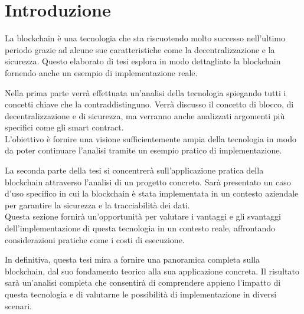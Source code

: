 \chapter{Introduzione}
\label{cha:introduzione}

La blockchain è una tecnologia che sta riscuotendo molto successo nell'ultimo
periodo grazie ad alcune sue caratteristiche come la decentralizzazione e la
sicurezza. Questo elaborato di tesi esplora in modo dettagliato la blockchain
fornendo anche un esempio di implementazione reale.

Nella prima parte verrà effettuata un'analisi della tecnologia spiegando tutti
i concetti chiave che la contraddistinguno. Verrà discusso il concetto di
blocco, di decentralizzazione e di sicurezza, ma verranno anche analizzati
argomenti più specifici come gli smart contract. \\ 
L'obiettivo è fornire una visione sufficientemente ampia della tecnologia in
modo da poter continuare l'analisi tramite un esempio pratico di
implementazione.

La seconda parte della tesi si concentrerà sull'applicazione pratica della
blockchain attraverso l'analisi di un progetto concreto. Sarà presentato un
caso d'uso specifico in cui la blockchain è stata implementata in un contesto
aziendale per garantire la sicurezza e la tracciabilità dei dati. \\ 
Questa sezione fornirà un'opportunità per valutare i vantaggi e gli svantaggi
dell'implementazione di questa tecnologia in un contesto reale, affrontando
considerazioni pratiche come i costi di esecuzione.

In definitiva, questa tesi mira a fornire una panoramica completa sulla
blockchain, dal suo fondamento teorico alla sua applicazione concreta. Il
risultato sarà un'analisi completa che consentirà di comprendere appieno
l'impatto di questa tecnologia e di valutarne le possibilità di implementazione
in diversi scenari.

